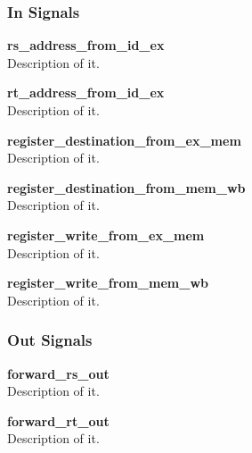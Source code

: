 
\subsubsection{In Signals}

\begin{description}
\item{\textbf{rs\_address\_from\_id\_ex}} \\
Description of it.
\item{\textbf{rt\_address\_from\_id\_ex}} \\
Description of it.
\item{\textbf{register\_destination\_from\_ex\_mem}} \\
Description of it.
\item{\textbf{register\_destination\_from\_mem\_wb}} \\
Description of it.
\item{\textbf{register\_write\_from\_ex\_mem}} \\
Description of it.
\item{\textbf{register\_write\_from\_mem\_wb}} \\
Description of it.
\end{description}

\subsubsection{Out Signals}

\begin{description}
\item{\textbf{forward\_rs\_out}} \\
Description of it.
\item{\textbf{forward\_rt\_out}} \\
Description of it.
\end{description}
